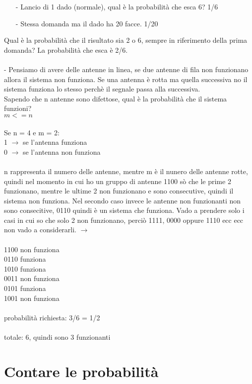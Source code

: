 \documentclass[12pt, letterpaper]{article}
\begin{document}
\begin{itemize}
	\item[-] Lancio di 1 dado (normale), qual è la probabilità che esca 6? 1/6
	\item[-] Stessa domanda ma il dado ha 20 facce. 1/20
\end{itemize}
Qual è la probabilità che il risultato sia 2 o 6, sempre in riferimento della prima domanda?
La probabilità che esca è 2/6.
\\
\\- Pensiamo di avere delle antenne in linea, se due antenne di fila non funzionano
allora il sistema non funziona. Se una antenna è rotta ma quella successiva no il sistema funziona lo stesso
perchè il segnale passa alla successiva.
\\
Sapendo che n antenne sono difettose, qual è la probabilità che il sistema funzioni?
\\$m <= n$
\\
\\Se n = 4 e m = 2:
\\1 $\rightarrow$ se l'antenna funziona
\\0 $\rightarrow$ se l'antenna non funziona
\\
\\
n rappresenta il numero delle antenne, mentre m è il nunero delle antenne rotte,
quindi nel momento in cui ho un gruppo di antenne 1100 sò che le prime 2 funzionano,
mentre le ultime 2 non funzionano e sono consecutive, quindi il sistema non funziona.
Nel secondo caso invece le antenne non funzionanti non sono consecitive, 0110 quindi è un 
sistema che funziona. Vado a prendere solo i casi in cui so che solo 2 non funzionano, perciò
1111, 0000 oppure 1110 ecc ecc non vado a considerarli. $\rightarrow$
\\
\\
1100 non funziona\\
0110 funziona\\
1010 funziona\\
0011 non funziona\\
0101 funziona\\
1001 non funziona\\
\\ probabilità richiesta: 3/6 = 1/2
\\
\\totale: 6, quindi sono 3 funzionanti
\newpage
\section{Contare le probabilità}
\end{document}
